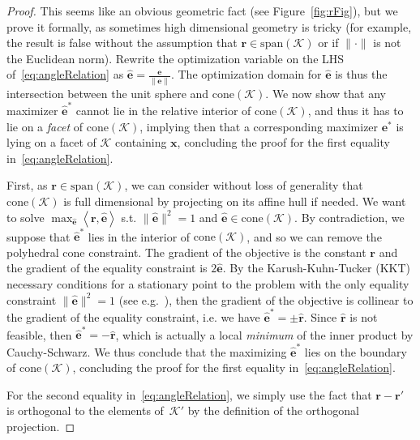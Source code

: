 \documentclass{article} %
\newcommand{\x}{\bm{x}}
\renewcommand{\r}{\bm{r}}
\newcommand{\innerProd}[2]{\left\langle #1 , #2 \right\rangle}
\newcommand{\Kface}{\mathcal{K}}
\newcommand{\err}{\bm{e}} %
\newcommand{\0}{\mathbf{0}} %
\begin{document}
\begin{proof}
This seems like an obvious geometric fact (see Figure~\ref{fig:rFig}), but we prove it formally, as sometimes high dimensional geometry is tricky (for example, the result is false without the assumption that $\r \in \text{span}(\Kface)$ or if $\|\cdot\|$ is not the Euclidean norm). Rewrite the optimization variable on the LHS of~\eqref{eq:angleRelation} as $\hat{\err} = \frac{\err}{\|\err\|}$. The optimization domain for $\hat{\err}$ is thus the intersection between the unit sphere and $\text{cone}(\Kface)$.
We now show that any maximizer $\hat{\err}^*$ cannot lie in the relative interior of $\text{cone}(\Kface)$, and thus it has to lie on a \emph{facet} of $\text{cone}(\Kface)$, implying then that a corresponding maximizer $\err^*$ is lying on a facet of $\Kface$ containing $\x$, concluding the proof for the first equality in~\eqref{eq:angleRelation}.

First, as $\r \in \text{span}(\Kface)$, we can consider without loss of generality that $\text{cone}(\Kface)$ is full dimensional by projecting on its affine hull if needed. We want to solve $\max_{\hat{\err}} \innerProd{\r}{\hat{\err}}$ s.t. $\| \hat{\err}\|^2=1$ and $\hat{\err} \in \text{cone}(\Kface)$. By contradiction, we suppose that $\hat{\err}^*$ lies in the interior of $\text{cone}(\Kface)$, and so we can remove the polyhedral cone constraint. The gradient of the objective is the constant $\r$ and the gradient of the equality constraint is $2\hat{\err}$. By the Karush-Kuhn-Tucker (KKT) necessary conditions for a stationary point to the problem with the only equality constraint $\| \hat{\err}\|^2=1$ (see e.g.~), 
%
then the gradient of the objective is collinear to the gradient of the equality constraint, i.e. we have $\hat{\err}^* = \pm \hat{\r}$. Since $\hat{\r}$ is not feasible, then $\hat{\err}^* = -\hat{\r}$, which is actually a local \emph{minimum} of the inner product by Cauchy-Schwarz. We thus conclude that the maximizing $\hat{\err}^*$ lies on the boundary of $\text{cone}(\Kface)$, concluding the proof for the first equality in~\eqref{eq:angleRelation}.

For the second equality in~\eqref{eq:angleRelation}, we simply use the fact that $\r - \r'$ is orthogonal
to the elements of~$\Kface'$ by the definition of the orthogonal projection.
\end{proof}
\end{document}
